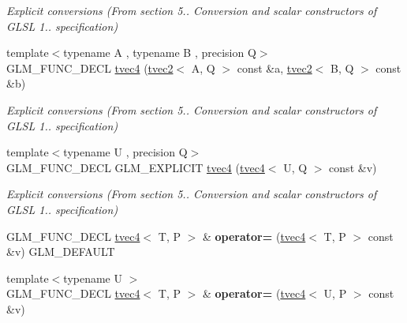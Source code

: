 \begin{DoxyCompactItemize}
\begin{DoxyCompactList}\small\item\em Explicit conversions (From section 5.. Conversion and scalar constructors of G\-L\-S\-L 1.. specification) \end{DoxyCompactList}\item 
\hypertarget{structglm_1_1tvec4_a366c3e1eaf05a24518eb47e0d87015dc}{{\footnotesize template$<$typename A , typename B , precision Q$>$ }\\G\-L\-M\-\_\-\-F\-U\-N\-C\-\_\-\-D\-E\-C\-L \hyperlink{structglm_1_1tvec4_a366c3e1eaf05a24518eb47e0d87015dc}{tvec4} (\hyperlink{structglm_1_1tvec2}{tvec2}$<$ A, Q $>$ const \&a, \hyperlink{structglm_1_1tvec2}{tvec2}$<$ B, Q $>$ const \&b)}\label{structglm_1_1tvec4_a366c3e1eaf05a24518eb47e0d87015dc}

\begin{DoxyCompactList}\small\item\em Explicit conversions (From section 5.. Conversion and scalar constructors of G\-L\-S\-L 1.. specification) \end{DoxyCompactList}\item 
\hypertarget{structglm_1_1tvec4_a14e75a80084280bf33a6d63d1802fac2}{{\footnotesize template$<$typename U , precision Q$>$ }\\G\-L\-M\-\_\-\-F\-U\-N\-C\-\_\-\-D\-E\-C\-L G\-L\-M\-\_\-\-E\-X\-P\-L\-I\-C\-I\-T \hyperlink{structglm_1_1tvec4_a14e75a80084280bf33a6d63d1802fac2}{tvec4} (\hyperlink{structglm_1_1tvec4}{tvec4}$<$ U, Q $>$ const \&v)}\label{structglm_1_1tvec4_a14e75a80084280bf33a6d63d1802fac2}

\begin{DoxyCompactList}\small\item\em Explicit conversions (From section 5.. Conversion and scalar constructors of G\-L\-S\-L 1.. specification) \end{DoxyCompactList}\item 
\hypertarget{structglm_1_1tvec4_a0997bf645d42c36ec509712b8d3b9e56}{G\-L\-M\-\_\-\-F\-U\-N\-C\-\_\-\-D\-E\-C\-L \hyperlink{structglm_1_1tvec4}{tvec4}$<$ T, P $>$ \& {\bfseries operator=} (\hyperlink{structglm_1_1tvec4}{tvec4}$<$ T, P $>$ const \&v) G\-L\-M\-\_\-\-D\-E\-F\-A\-U\-L\-T}\label{structglm_1_1tvec4_a0997bf645d42c36ec509712b8d3b9e56}

\item 
\hypertarget{structglm_1_1tvec4_ac0decc5432f220ec3026a99866ee356d}{{\footnotesize template$<$typename U $>$ }\\G\-L\-M\-\_\-\-F\-U\-N\-C\-\_\-\-D\-E\-C\-L \hyperlink{structglm_1_1tvec4}{tvec4}$<$ T, P $>$ \& {\bfseries operator=} (\hyperlink{structglm_1_1tvec4}{tvec4}$<$ U, P $>$ const \&v)}\label{structglm_1_1tvec4_ac0decc5432f220ec3026a99866ee356d}


\end{DoxyCompactItemize}
